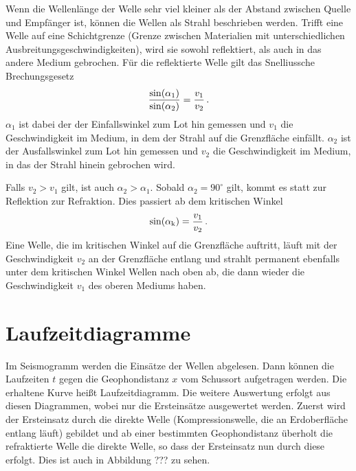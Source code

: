 Wenn die Wellenlänge der Welle sehr viel kleiner als der Abstand zwischen Quelle und Empfänger ist, können die Wellen als Strahl beschrieben werden. Trifft eine Welle auf eine Schichtgrenze (Grenze zwischen Materialien mit unterschiedlichen Ausbreitungsgeschwindigkeiten), wird sie sowohl reflektiert, als auch in das andere Medium gebrochen. Für die reflektierte Welle gilt das Snelliussche Brechungsgesetz
\begin{equation}
 \frac{\sin(\alpha_1)}{\sin(\alpha_2)}=\frac{v_1}{v_2}\text{\,.}
\end{equation}
$\alpha_1$ ist dabei der der Einfallswinkel zum Lot hin gemessen und $v_1$ die Geschwindigkeit im Medium, in dem der Strahl auf die Grenzfläche einfällt. $\alpha_2$ ist der Ausfallswinkel zum Lot hin gemessen und $v_2$ die Geschwindigkeit im Medium, in das der Strahl hinein gebrochen wird.

Falls $v_2>v_1$ gilt, ist auch $\alpha_2>\alpha_1$. Sobald $\alpha_2=90^\circ$ gilt, kommt es statt zur Reflektion zur Refraktion. Dies passiert ab dem kritischen Winkel
\begin{equation}
 \sin(\alpha_{\mathrm{k}}) =\frac{v_1}{v_2} \text{\,.}
\end{equation}
Eine Welle, die im kritischen Winkel auf die Grenzfläche auftritt, läuft mit der Geschwindigkeit $v_2$ an der Grenzfläche entlang und strahlt permanent ebenfalls unter dem kritischen Winkel Wellen nach oben ab, die dann wieder die Geschwindigkeit $v_1$ des oberen Mediums haben.

\section{Laufzeitdiagramme}

Im Seismogramm werden die Einsätze der Wellen abgelesen. Dann können die Laufzeiten $t$ gegen die Geophondistanz $x$ vom Schussort aufgetragen werden. Die erhaltene Kurve heißt Laufzeitdiagramm. Die weitere Auswertung erfolgt aus diesen Diagrammen, wobei nur die Ersteinsätze ausgewertet werden. Zuerst wird der Ersteinsatz durch die direkte Welle (Kompressionswelle, die an Erdoberfläche entlang läuft) gebildet und ab einer bestimmten Geophondistanz überholt die refraktierte Welle die direkte Welle, so dass der Ersteinsatz nun durch diese erfolgt. Dies ist auch in Abbildung ??? zu sehen.


